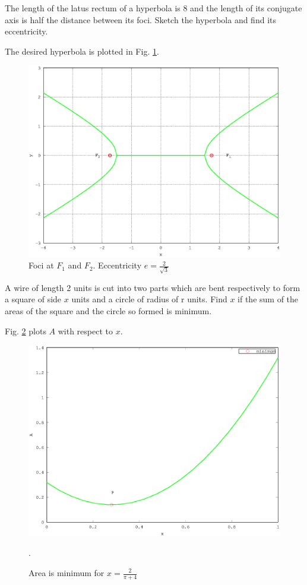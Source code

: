 \documentclass[journal,12pt,twocolumn]{IEEEtran}
\begin{document}
\renewcommand{\thefigure}{\theproblem}
\begin{problem}
The length of the latus rectum of a hyperbola is 8 and the length of its conjugate axis is half the distance between its foci.  Sketch the hyperbola and find its eccentricity.
\end{problem}
\solution

The desired hyperbola is plotted in Fig. \ref{fig_38}.

%
\begin{figure}[h]
\centering
\includegraphics[width=\columnwidth]{./version_2/ee16b1038/ee16b1038}
\caption{ Foci at $F_1$ and $F_2$. Eccentricity $e = \frac{2}{\sqrt{3}}$}
\label{fig_38}	
\end{figure}
%
\begin{problem}
A wire of length 2 units is cut into two parts which are bent respectively to form a square of side $x$ units and a circle of radius of r units. Find $x$ if the sum of the areas of the square and the circle so formed is minimum.
\end{problem}
\solution

Fig. \ref{fig_39} plots $A$ with respect to $x$.

%
\begin{figure}[h]
\centering
\includegraphics[width=\columnwidth]{./version_2/ee16b1039/ee16b1039}
\caption{ Area is minimum for $x = \frac{2}{\pi + 4}$}.
\label{fig_39}	
\end{figure}
%
\end{document}
